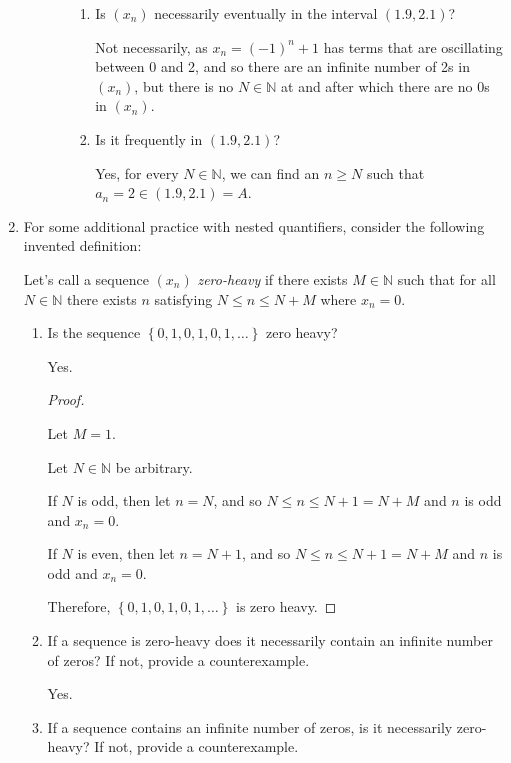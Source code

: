\documentclass[12pt]{article}
\newcommand{\NN}{\mathbb{N}}
\newcommand\set[1]{\left\lbrace #1 \right\rbrace} %
\begin{document}
\begin{enumerate}
\begin{enumerate}
\begin{enumerate}
\begin{enumerate}
\item
Is $(x_n)$ necessarily eventually in the interval $(1.9, 2.1)$?

Not necessarily, as $x_n = (-1)^n + 1$ has terms that are oscillating between 0 and 2, and so there are an infinite number of 2s in $(x_n)$, but there is no $N \in \NN$ at and after which there are no 0s in $(x_n)$.

\item
Is it frequently in $(1.9, 2.1)$?

Yes, for every $N \in \NN$, we can find an $n \ge N$ such that
\\
$a_n = 2 \in (1.9, 2.1) = A$.
\end{enumerate}

\end{enumerate}
\end{enumerate}

\item For some additional practice with nested quantifiers, consider the following invented definition:

Let's call a sequence $(x_n)$ \textit{zero-heavy} if there exists $M \in \NN$ such that for all $N \in \NN$ there exists $n$ satisfying $N \le n \le N + M$ where $x_n = 0$.
\begin{enumerate}
\item Is the sequence $\set{0, 1, 0, 1, 0, 1, \dots}$ zero heavy?

Yes.

\begin{proof}
$ $

Let $M = 1$.

Let $N \in \NN$ be arbitrary.

If $N$ is odd, then let $n = N$, and so $N \le n \le N + 1 = N + M$ and $n$ is odd and $x_n = 0$.

If $N$ is even, then let $n = N + 1$, and so $N \le n \le N + 1 = N + M$ and $n$ is odd and $x_n = 0$.

Therefore, $\set{0, 1, 0, 1, 0, 1, \dots}$ is zero heavy.
\end{proof}

\item If a sequence is zero-heavy does it necessarily contain an infinite number of zeros? If not, provide a counterexample.

Yes.

\item If a sequence contains an infinite number of zeros, is it necessarily zero-heavy? If not, provide a counterexample.


\end{enumerate}
\end{enumerate}
\end{document}
